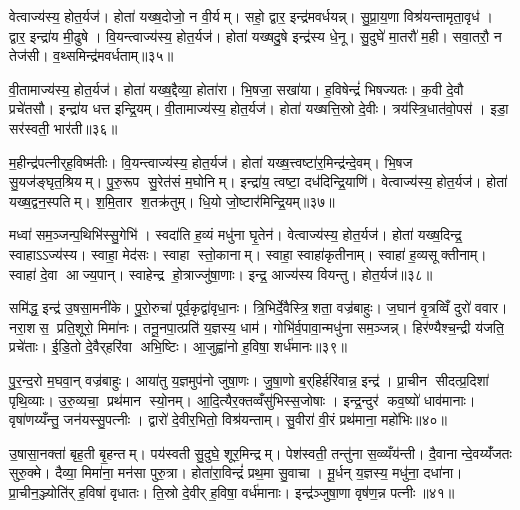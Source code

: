 वेत्वाज्य॑स्य॒ होत॒र्यज॑। होता॑ यख्ष॒दोजो॒ न वी॒र्यम्। सहो॒ द्वार॒ इन्द्र॑मवर्धयन्न्। सु॒प्रा॒य॒णा विश्र॑यन्तामृता॒वृध॑। द्वार॒ इन्द्रा॑य मी॒ढुषे। वि॒यन्त्वाज्य॑स्य॒ होत॒र्यज॑। होता॑ यख्षदु॒षे इन्द्र॑स्य धे॒नू। सु॒दुघे॑ मा॒तरौ॑ म॒ही। सवा॒तरौ॒ न तेज॑सी। व॒थ्समिन्द्र॑मवर्धताम्॥३५॥

वी॒तामाज्य॑स्य॒ होत॒र्यज॑। होता॑ यख्ष॒द्दैव्या॒ होता॑रा। भि॒षजा॒ सखा॑या। ह॒विषेन्द्रं॑ भिषज्यतः। क॒वी दे॒वौ प्रचे॑तसौ। इन्द्रा॑य धत्त इन्द्रि॒यम्। वी॒तामाज्य॑स्य॒ होत॒र्यज॑। होता॑ यख्षत्ति॒स्रो दे॒वीः। त्रय॑स्त्रि॒धात॑वो॒पस॑। इडा॒ सर॑स्वती॒ भार॑ती॥३६॥

म॒हीन्द्र॑पत्नीर्‌ह॒विष्म॑तीः। वि॒यन्त्वाज्य॑स्य॒ होत॒र्यज॑। होता॑ यख्ष॒त्त्वष्टा॑र॒मिन्द्र॑न्दे॒वम्। भि॒षज सु॒यज॑ङ्घृत॒श्रियम्। पु॒रु॒रूप सु॒रेत॑सं म॒घोनिम्। इन्द्रा॑य॒ त्वष्टा॒ दध॑दिन्द्रि॒याणि॑। वेत्वाज्य॑स्य॒ होत॒र्यज॑। होता॑ यख्ष॒द्वन॒स्पतिम्। श॒मि॒तार श॒तक्र॑तुम्। धि॒यो जो॒ष्टार॑मिन्द्रि॒यम्॥३७॥

मध्वा॑ सम॒ञ्जन्प॒थिभि॑स्सु॒गेभि॑। स्वदा॑ति ह॒व्यं मधु॑ना घृ॒तेन॑। वेत्वाज्य॑स्य॒ होत॒र्यज॑। होता॑ यख्ष॒दिन्द्र॒ स्वाहाऽऽज्य॑स्य। स्वाहा॒ मेद॑सः। स्वाहा स्तो॒कानाम्। स्वाहा॒ स्वाहा॑कृतीनाम्। स्वाहा॑ ह॒व्यसूक्तीनाम्। स्वाहा॑ दे॒वा आज्य॒पान्। स्वाहेन्द्र हो॒त्राज्जु॑षा॒णाः। इन्द्र॒ आज्य॑स्य वियन्तु। होत॒र्यज॑॥३८॥\anuvakamend[तेज॑साऽऽसददवर्धतां॒ भार॑तीन्द्रि॒यञ्जु॑षा॒णा द्वे च॑ (स॒मिधेन्द्र॒न्तनू॒नपा॑त॒मिडा॑भिर्ब॒र्॒हिष्योज॑ उ॒षे दैव्या॑ ति॒स्रस्त्वष्टा॑रं॒ वन॒स्पति॒मिन्द्रम् ॥ स॒मिधेन्द्र॑ञ्च॒तुर्वेत्वेको॑ वि॒यन्तु॒ द्विर्वी॒तामेको॑ वि॒यन्तु॒ द्विर्वेत्वेको॑ वि॒यन्तु॒ होत॒र्यज॑ ॥ )]

समि॑द्ध॒ इन्द्र॑ उ॒षसा॒मनी॑के। पु॒रो॒रुचा॑ पूर्व॒कृद्वा॑वृधा॒नः। त्रि॒भिर्दे॒वैस्त्रि॒शता॒ वज्र॑बाहुः। ज॒घान॑ वृ॒त्रव्विँ दुरो॑ ववार। नरा॒शस॒ प्रति॒शूरो॒ मिमा॑नः। तनू॒नपा॒त्प्रति॑ य॒ज्ञस्य॒ धाम॑। गोभि॑र्व॒पावा॒न्मधु॑ना सम॒ञ्जन्न्। हिर॑ण्यैश्च॒न्द्री य॑जति॒ प्रचे॑ताः। ई॒डि॒तो दे॒वैर्‌हरि॑वा अभि॒ष्टिः। आ॒जुह्वा॑नो ह॒विषा॒ शर्ध॑मानः॥३९॥

पु॒र॒न्द॒रो म॒घवा॒न् वज्र॑बाहुः। आया॑तु य॒ज्ञमुप॑नो जुषा॒णः। जु॒षा॒णो ब॒र्‌हिर्हरि॑वान्न॒ इन्द्र॑। प्रा॒चीन सीदत्प्र॒दिशा॑ पृथि॒व्याः। उ॒रु॒व्यचा॒ प्रथ॑मान स्यो॒नम्। आ॒दि॒त्यैर॒क्तव्वँसु॑भिस्स॒जोषाः। इन्द्र॒न्दुर॑ कव॒ष्यो॑ धाव॑मानाः। वृषा॑णय्यँन्तु॒ जन॑यस्सु॒पत्नीः। द्वारो॑ दे॒वीर॒भितो॒ विश्र॑यन्ताम्। सु॒वीरा॑ वी॒रं प्रथ॑माना॒ महो॑भिः॥४०॥

उ॒षासा॒नक्ता॑ बृह॒ती बृ॒हन्तम्। पय॑स्वती सु॒दुघे॒ शूर॒मिन्द्रम्। पेश॑स्वती॒ तन्तु॑ना स॒व्व्यँय॑न्ती। दै॒वानान्दे॒वय्यँ॑जतः सुरु॒क्मे। दैव्या॒ मिमा॑ना॒ मन॑सा पुरु॒त्रा। होता॑रा॒विन्द्रं॑ प्रथ॒मा सु॒वाचा। मू॒र्धन् य॒ज्ञस्य॒ मधु॑ना॒ दधा॑ना। प्रा॒चीन॒ञ्ज्योति॑र् ह॒विषा॑ वृधातः। ति॒स्रो दे॒वीर्‌ ह॒विषा॒ वर्ध॑मानाः। इन्द्र॑ञ्जुषा॒णा वृष॑ण॒न्न पत्नीः॥४१॥

